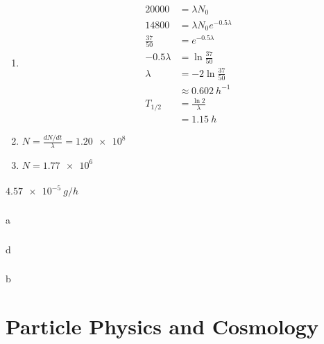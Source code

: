 \documentclass{article}
\begin{document}
\begin{enumerate}
  \item

        \begin{align*}
          \num{20000}   & = \lambda N_0                  \\
          \num{14800}   & = \lambda N_0 e^{-0.5 \lambda} \\
          \frac{37}{50} & = e^{-0.5 \lambda}             \\
          -0.5 \lambda  & = \ln \frac{37}{50}            \\
          \lambda       & = -2 \ln \frac{37}{50}         \\
                        & \approx \qty{0.602}{h^{-1}}    \\
          T_{1 / 2}     & = \frac{\ln 2}{\lambda}        \\
                        & = \qty{1.15}{h}
        \end{align*}

  \item $N = \frac{d N / d t}{\lambda} = \num{1.20e8}$

  \item $N = \num{1.77e6}$
\end{enumerate}

\setcounter{subsubsection}{70}
\subsubsection{}

$\qty{4.57e-5}{g/h}$

\setcounter{subsubsection}{72}
\subsubsection{}

a

\setcounter{subsubsection}{74}
\subsubsection{}

d

\setcounter{subsubsection}{76}
\subsubsection{}

b

\section{Particle Physics and Cosmology}
\end{document}
